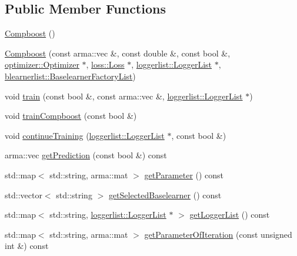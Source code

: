 \subsection*{Public Member Functions}
\begin{DoxyCompactItemize}
\item 
\mbox{\hyperlink{classcboost_1_1_compboost_a5117b7b8cf0a424e736f6833bc5c3a68}{Compboost}} ()
\item 
\mbox{\hyperlink{classcboost_1_1_compboost_a24b98d64e9aac2a7a8ec4e64a49a1f7c}{Compboost}} (const arma\+::vec \&, const double \&, const bool \&, \mbox{\hyperlink{classoptimizer_1_1_optimizer}{optimizer\+::\+Optimizer}} $\ast$, \mbox{\hyperlink{classloss_1_1_loss}{loss\+::\+Loss}} $\ast$, \mbox{\hyperlink{classloggerlist_1_1_logger_list}{loggerlist\+::\+Logger\+List}} $\ast$, \mbox{\hyperlink{classblearnerlist_1_1_baselearner_factory_list}{blearnerlist\+::\+Baselearner\+Factory\+List}})
\item 
void \mbox{\hyperlink{classcboost_1_1_compboost_aa898572eb2c83e0b95c12788a859333b}{train}} (const bool \&, const arma\+::vec \&, \mbox{\hyperlink{classloggerlist_1_1_logger_list}{loggerlist\+::\+Logger\+List}} $\ast$)
\item 
void \mbox{\hyperlink{classcboost_1_1_compboost_a52ea04dec53c68865fdc4a79461d17cb}{train\+Compboost}} (const bool \&)
\item 
void \mbox{\hyperlink{classcboost_1_1_compboost_a191aa22dbfcc3d2e878ef75c0b196d07}{continue\+Training}} (\mbox{\hyperlink{classloggerlist_1_1_logger_list}{loggerlist\+::\+Logger\+List}} $\ast$, const bool \&)
\item 
arma\+::vec \mbox{\hyperlink{classcboost_1_1_compboost_a741143ae1cb41c54346e19f8bec3454d}{get\+Prediction}} (const bool \&) const
\item 
std\+::map$<$ std\+::string, arma\+::mat $>$ \mbox{\hyperlink{classcboost_1_1_compboost_a7b90eaa8107f91806b09ceedf8581537}{get\+Parameter}} () const
\item 
std\+::vector$<$ std\+::string $>$ \mbox{\hyperlink{classcboost_1_1_compboost_ac66d4490e6539832d4d304a86db746dc}{get\+Selected\+Baselearner}} () const
\item 
std\+::map$<$ std\+::string, \mbox{\hyperlink{classloggerlist_1_1_logger_list}{loggerlist\+::\+Logger\+List}} $\ast$ $>$ \mbox{\hyperlink{classcboost_1_1_compboost_a0376256bdfde1a50b420ad7412f4b4dd}{get\+Logger\+List}} () const
\item 
std\+::map$<$ std\+::string, arma\+::mat $>$ \mbox{\hyperlink{classcboost_1_1_compboost_a97b02aa81981e08658d896ff9798b5d0}{get\+Parameter\+Of\+Iteration}} (const unsigned int \&) const

\end{DoxyCompactItemize}
